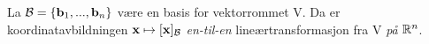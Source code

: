 La $\mathcal{B} = \{ \mathbf{b}_1, ..., \mathbf{b}_n \}$ være en basis for vektorrommet V.
Da er koordinatavbildningen $\mathbf{x} \mapsto [\mathbf{x}]_{\mathcal{B}}$
\emph{en-til-en} lineærtransformasjon fra V \emph{på} $\mathbb{R}^n$.
